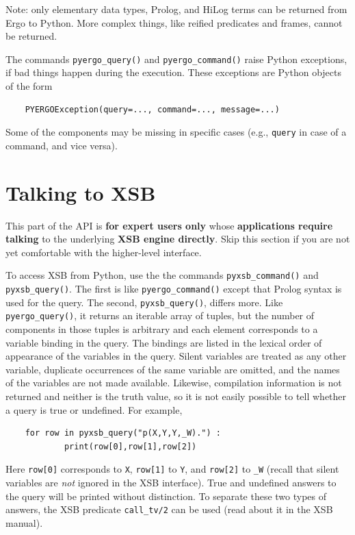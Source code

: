 Note: only elementary data types, Prolog, and HiLog terms can be returned
from Ergo to Python. More complex things, like reified predicates and
frames, cannot be returned.

The commands \texttt{pyergo\_query()} and
\texttt{pyergo\_command()} raise Python exceptions, if bad things happen
during the execution. These exceptions are Python objects of the form
\begin{verbatim}
    PYERGOException(query=..., command=..., message=...)
\end{verbatim}
Some of the components may be missing in specific cases (e.g.,
\texttt{query} in case of a command, and vice versa).


\section{Talking to XSB}\label{sec-pyxsb-query}

This part of the 
API is \textbf{for expert users only} whose \textbf{applications require
  talking}    to
the underlying \textbf{XSB engine directly}.   
Skip this section if you are not yet comfortable with the higher-level
\FLSYSTEM interface.

To access XSB from Python, use the
the commands  \texttt{pyxsb\_command()} and \texttt{pyxsb\_query()}.
The first is like
\texttt{pyergo\_command()} except that Prolog syntax is used for the
query.  The second, \texttt{pyxsb\_query()}, differs more.  Like
\texttt{pyergo\_query()}, it returns an iterable array of tuples, but the
number of components in those tuples is arbitrary and each element
corresponds to a variable binding in the query. The bindings are listed in
the lexical order of appearance of the variables in the query.  Silent variables
are treated as any other variable, duplicate occurrences of the same
variable are omitted, and the names of the variables are not made
available.  Likewise, compilation information is not returned and neither
is the truth value, so it is not easily possible to tell whether a query is
true or undefined.
For example,
\begin{verbatim}
    for row in pyxsb_query("p(X,Y,Y,_W).") :
            print(row[0],row[1],row[2])
\end{verbatim}
Here \texttt{row[0]} corresponds to \texttt{X}, \texttt{row[1]}  
to \texttt{Y}, and \texttt{row[2]} to \texttt{\_W} (recall that silent
variables are \emph{not} ignored in the XSB interface).
True and undefined answers to the query will be printed without
distinction. To separate these two types of answers, the XSB predicate
\texttt{call\_tv/2} can be used (read about it in the XSB manual). 

